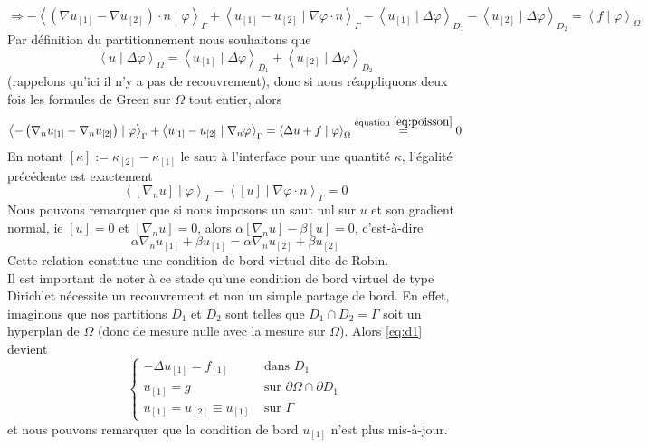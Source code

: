 \documentclass[a4paper,11pt]{article}
\begin{document}
\begin{equation*}
\Longrightarrow -\left<\left(\nabla u_{[1]}-\nabla u_{[2]}\right)\cdot n\mid \varphi\right>_{\Gamma} + \left<u_{[1]} - u_{[2]}\mid\nabla \varphi\cdot n\right>_{\Gamma} - \left<u_{[1]} \mid \Delta \varphi\right>_{D_1} - \left<u_{[2]} \mid \Delta \varphi\right>_{D_2} = \left<f\mid \varphi\right>_{\Omega}
\end{equation*}
Par définition du partitionnement nous souhaitons que 
\begin{equation*}
\left< u \mid \Delta \varphi\right>_{\Omega} = \left< u_{[1]} \mid \Delta \varphi\right>_{D_1} + \left< u_{[2]} \mid \Delta \varphi\right>_{D_2}
\end{equation*}
(rappelons qu'ici il n'y a pas de recouvrement), donc si nous réappliquons deux fois les formules de Green sur $\Omega$ tout entier, alors
\begin{equation*}
\left<-\left(\nabla_n u_{[1]}-\nabla_n u_{[2]}\right) \mid \varphi\right>_{\Gamma} + \left<u_{[1]} - u_{[2]}\mid\nabla_n \varphi\right>_{\Gamma} = \left<\Delta u + f\mid \varphi\right>_{\Omega} \overset{\text{équation }\eqref{eq:poisson}}{=} 0
\end{equation*}
En notant $[\kappa] := \kappa_{[2]}- \kappa_{[1]}$ le saut à l'interface pour une quantité $\kappa$, l'égalité précédente est exactement
\begin{equation*}
\left< [\nabla_n u] \mid \varphi\right>_{\Gamma} - \left<[u]\mid\nabla \varphi\cdot n\right>_{\Gamma} = 0
\end{equation*}
Nous pouvons remarquer que  si nous imposons un saut nul sur $u$ et son gradient normal, ie $[u] = 0$ et $ [\nabla_n u] = 0$, alors $\alpha [\nabla_n u] - \beta[u] = 0$, c'est-à-dire
\begin{equation*}
\alpha \nabla_n u_{[1]} + \beta u_{[1]} = \alpha \nabla_n u_{[2]} + \beta u_{[2]}
\end{equation*}
Cette relation constitue une condition de bord virtuel dite de Robin.\\

\noindent Il est important de noter à ce stade qu'une condition de bord virtuel de type Dirichlet nécessite un recouvrement et non un simple partage de bord. En effet, imaginons que nos partitions $D_1$ et $D_2$ sont telles que $D_1 \cap D_2 = \Gamma$ soit un hyperplan de $\Omega$ (donc de mesure nulle avec la mesure sur $\Omega$). Alors \eqref{eq:d1} devient 
\begin{equation*}
	\begin{cases}
		-\Delta u_{[1]} = f_{[1]}&\text{ dans $D_1$}\\
		u_{[1]} = g & \text{ sur $\partial \Omega \cap \partial D_1$}\\
		u_{[1]} = u_{[2]} \equiv u_{[1]}  &\text{ sur $\Gamma$}
	\end{cases}
\end{equation*}
et nous pouvons remarquer que la condition de bord $u_{[1]}$ n'est plus mis-à-jour.
\end{document}
